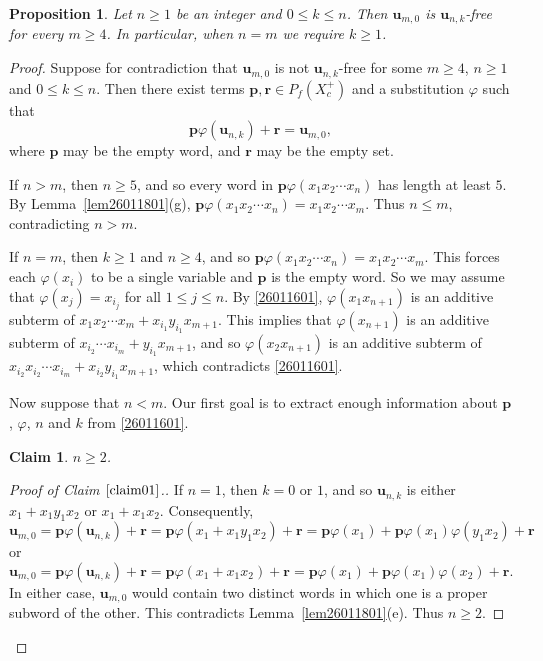 \documentclass[reqno]{amsart}
\theoremstyle{plain}
\newtheorem{pro}[thm]{Proposition}
\newtheorem{claim}{Claim}[section]
\theoremstyle{definition}
\newcommand{\bp}{\mathbf{p}}
\newcommand{\br}{\mathbf{r}}
\newcommand{\bu}{\mathbf{u}}
\begin{document}
\begin{pro}\label{pro26012501}
Let $n \geq 1$ be an integer and $0 \leq k \leq n$.
Then $\mathbf{u}_{m,0}$ is $\mathbf{u}_{n,k}$-free for every $m \geq 4$.
In particular, when $n = m$ we require $k \geq 1$.
\end{pro}
\begin{proof}
Suppose for contradiction that $\bu_{m, 0}$ is not $\bu_{n, k}$-free for some $m \geq 4$, $n\geq1$ and $0\leq k\leq n$.
Then there exist terms $\bp, \br\in P_f(X_c^+)$ and a substitution $\varphi$ such that
\begin{equation}\label{26011601}
\bp\varphi(\bu_{n,k})+\br=\bu_{m,0},
\end{equation}
where $\bp$ may be the empty word, and $\br$ may be the empty set.

If $n>m$, then $n\geq 5$, and so every word in $\bp\varphi(x_1x_2\cdots x_n)$ has length at least $5$.
By Lemma~\ref{lem26011801}(g), $\bp\varphi(x_1x_2\cdots x_n)=x_1x_2\cdots x_m$.
Thus $n\leq m$, contradicting $n>m$.

If $n=m$, then $k \geq 1$ and $n\geq4$, and so $\bp\varphi(x_1x_2\cdots x_n)=x_1x_2\cdots x_m$.
This forces each $\varphi(x_i)$ to be a single variable and $\bp$ is the empty word.
So we may assume that $\varphi(x_j)=x_{i_j}$ for all $1\leq j \leq n$.
By \eqref{26011601},
$\varphi(x_1x_{n+1})$ is an additive subterm of $x_1x_2\cdots x_m+x_{i_1}y_{i_1}x_{m+1}$.
This implies that $\varphi(x_{n+1})$ is an additive subterm of $x_{i_2}\cdots x_{i_m}+y_{i_1}x_{m+1}$,
and so $\varphi(x_2x_{n+1})$ is an additive subterm of $x_{i_2}x_{i_2}\cdots x_{i_m}+x_{i_2}y_{i_1}x_{m+1}$,
which contradicts \eqref{26011601}.

Now suppose that $n<m$.
Our first goal is to extract enough information about $\bp$, $\varphi$, $n$ and $k$ from \eqref{26011601}.
\begin{claim}\label{claim01}
$n\geq2$.
\end{claim}
\begin{proof}[Proof of Claim $\ref{claim01}$.]
If $n=1$, then $k=0$ or $1$, and so $\bu_{n,k}$ is either $x_1+x_1y_1x_2$ or $x_1+x_1x_2$.
Consequently,
\[
\bu_{m,0}=\bp\varphi(\bu_{n,k})+\br=\bp\varphi(x_1+x_1y_1x_2)+\br=\bp\varphi(x_1)+\bp\varphi(x_1)\varphi(y_1x_2)+\br
\]
or
\[
\bu_{m,0}=\bp\varphi(\bu_{n,k})+\br=\bp\varphi(x_1+x_1x_2)+\br=\bp\varphi(x_1)+\bp\varphi(x_1)\varphi(x_2)+\br.
\]
In either case, $\bu_{m,0}$ would contain two distinct words in which one is a proper subword of the other.
This contradicts Lemma~\ref{lem26011801}(e).
Thus $n\geq2$.
\end{proof}


\end{proof}
\end{document}
